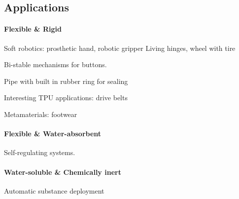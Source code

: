 \subsection{Applications}

\paragraph{Flexible \& Rigid}
Soft robotics: prosthetic hand, robotic gripper
Living hinges, wheel with tire

Bi-stable mechanisms for buttons.

Pipe with built in rubber ring for sealing

Interesting TPU applications: drive belts

Metamaterials: footwear

\paragraph{Flexible \& Water-absorbent}
Self-regulating systems.

\paragraph{Water-soluble \& Chemically inert}
Automatic substance deployment

